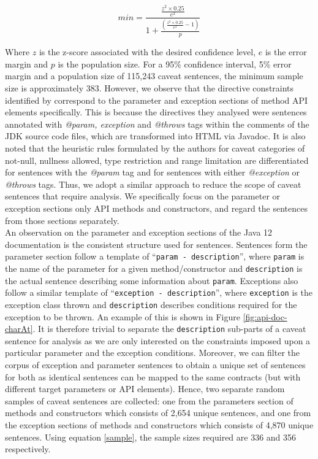 \begin{equation}
\label{sample}
min=\frac{\frac{z^2\times 0.25}{e^2}}{1 + \frac{(\frac{z^2\times 0.25}{e^2} - 1)}{p}}
\end{equation}

Where $z$ is the z-score associated with the desired confidence level, $e$ is the error margin and $p$ is the population size. For a 95\% confidence interval, 5\% error margin and a population size of 115,243 caveat sentences, the minimum sample size is approximately 383. However, we observe that the directive constraints identified by \cite{zhou-directive} correspond to the parameter and exception sections of method API elements specifically. This is because the directives they analysed were sentences annotated with \textit{@param, exception} and \textit{@throws} tags within the comments of the JDK source code files, which are transformed into HTML via Javadoc. It is also noted that the heuristic rules formulated by the authors for caveat categories of not-null, nullness allowed, type restriction and range limitation are differentiated for sentences with the \textit{@param} tag and for sentences with either \textit{@exception} or \textit{@throws} tags. Thus, we adopt a similar approach to reduce the scope of caveat sentences that require analysis. We specifically focus on the parameter or exception sections only API methods and constructors, and regard the sentences from those sections separately. \\

An observation on the parameter and exception sections of the Java 12 documentation is the consistent structure used for sentences. Sentences form the parameter section follow a template of ``\verb|param - description|'', where \verb|param| is the name of the parameter for a given method/constructor and \verb|description| is the actual sentence describing some information about \verb|param|. Exceptions also follow a similar template of ``\verb|exception - description|'', where \verb|exception| is the exception class thrown and \verb|description| describes conditions required for the exception to be thrown. An example of this is shown in Figure \ref{fig:api-doc-charAt}. It is therefore trivial to separate the \verb|description| sub-parts of a caveat sentence for analysis as we are only interested on the constraints imposed upon a particular parameter and the exception conditions. Moreover, we can filter the corpus of exception and parameter sentences to obtain a unique set of sentences for both as identical sentences can be mapped to the same contracts (but with different target parameters or API elements). Hence, two separate random samples of caveat sentences are collected: one from the parameters section of methods and constructors which consists of 2,654 unique sentences, and one from the exception sections of methods and constructors which consists of 4,870 unique sentences. Using equation \ref{sample}, the sample sizes required are 336 and 356 respectively. \\


